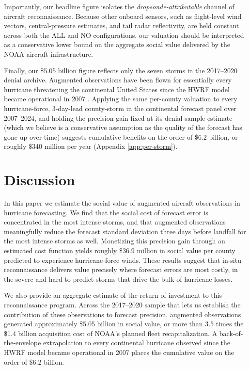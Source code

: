 \documentclass[12pt]{article}%
\begin{document}
Importantly, our headline figure isolates the \emph{dropsonde-attributable} channel of aircraft reconnaissance. Because other onboard sensors, such as flight-level wind vectors, central-pressure estimates, and tail radar reflectivity, are held constant across both the ALL and NO configurations, our valuation should be interpreted as a conservative lower bound on the aggregate social value delivered by the NOAA aircraft infrastructure.


Finally, our \$5.05 billion figure reflects only the seven storms in the 2017--2020 denial archive. Augmented observations have been flown for essentially every hurricane threatening the continental United States since the HWRF model became operational in 2007 \citep{AlakaJr2024}. Applying the same per-county valuation to every hurricane-force, 3-day-lead county-storm in the continental forecast panel over 2007--2024, and holding the precision gain fixed at its denial-sample estimate (which we believe is a conservative assumption as the quality of the forecast has gone up over time) suggests cumulative benefits on the order of \$6.2 billion, or roughly \$340 million per year (Appendix \ref{app:per-storm}).

\section{Discussion} \label{sec:discussion}

In this paper we estimate the social value of augmented aircraft observations in hurricane forecasting. We find that the social cost of forecast error is concentrated in the most intense storms, and that augmented observations meaningfully reduce the forecast standard deviation three days before landfall for the most intense storms as well. Monetizing this precision gain through an estimated cost function yields roughly \$36.9 million in social value per county predicted to experience hurricane-force winds. These results suggest that in-situ reconnaissance delivers value precisely where forecast errors are most costly, in the severe and hard-to-predict storms that drive the bulk of hurricane losses.

We also provide an aggregate estimate of the return of investment to this reconnaissance program. Across the 2017--2020 sample that lets us establish the contribution of these observations to forecast precision, augmented observations generated approximately \$5.05 billion in social value, or more than 3.5 times the \$1.4 billion acquisition cost of NOAA's planned fleet recapitalization. A back-of-the-envelope extrapolation to every continental hurricane observed since the HWRF model became operational in 2007 places the cumulative value on the order of \$6.2 billion.
\end{document}
